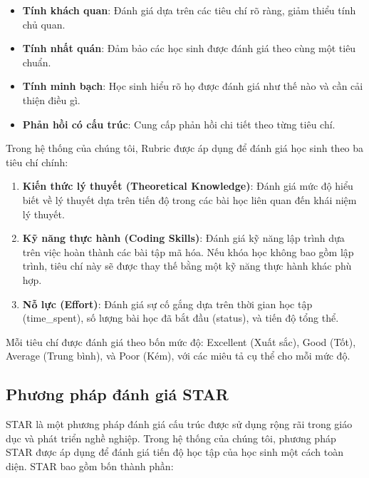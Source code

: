 \begin{itemize}
    \item \textbf{Tính khách quan}: Đánh giá dựa trên các tiêu chí rõ ràng, giảm thiểu tính chủ quan.
    \item \textbf{Tính nhất quán}: Đảm bảo các học sinh được đánh giá theo cùng một tiêu chuẩn.
    \item \textbf{Tính minh bạch}: Học sinh hiểu rõ họ được đánh giá như thế nào và cần cải thiện điều gì.
    \item \textbf{Phản hồi có cấu trúc}: Cung cấp phản hồi chi tiết theo từng tiêu chí.
\end{itemize}

Trong hệ thống của chúng tôi, Rubric được áp dụng để đánh giá học sinh theo ba tiêu chí chính:
\begin{enumerate}
    \item \textbf{Kiến thức lý thuyết (Theoretical Knowledge)}: Đánh giá mức độ hiểu biết về lý thuyết dựa trên tiến độ trong các bài học liên quan đến khái niệm lý thuyết.
    
    \item \textbf{Kỹ năng thực hành (Coding Skills)}: Đánh giá kỹ năng lập trình dựa trên việc hoàn thành các bài tập mã hóa. Nếu khóa học không bao gồm lập trình, tiêu chí này sẽ được thay thế bằng một kỹ năng thực hành khác phù hợp.
    
    \item \textbf{Nỗ lực (Effort)}: Đánh giá sự cố gắng dựa trên thời gian học tập (time\_spent), số lượng bài học đã bắt đầu (status), và tiến độ tổng thể.
\end{enumerate}

Mỗi tiêu chí được đánh giá theo bốn mức độ: Excellent (Xuất sắc), Good (Tốt), Average (Trung bình), và Poor (Kém), với các miêu tả cụ thể cho mỗi mức độ.

\subsection{Phương pháp đánh giá STAR}
STAR là một phương pháp đánh giá cấu trúc được sử dụng rộng rãi trong giáo dục và phát triển nghề nghiệp. Trong hệ thống của chúng tôi, phương pháp STAR được áp dụng để đánh giá tiến độ học tập của học sinh một cách toàn diện. STAR bao gồm bốn thành phần:

